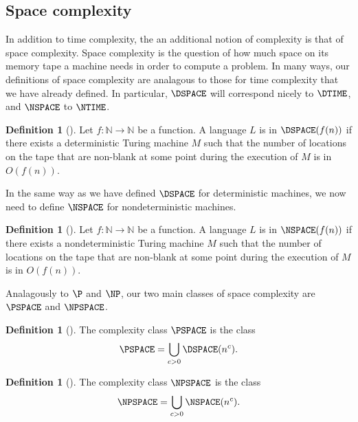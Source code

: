 \documentclass{reedthesis}
\theoremstyle{plain}
\theoremstyle{definition}
\newtheorem{defn}[thm]{Definition}
\theoremstyle{remark}
\numberwithin{equation}{section}
\begin{document}

\subsection{Space complexity}

In addition to time complexity, the an additional notion of complexity is that
of space complexity. Space complexity is the question of how much space on its
memory tape a machine needs in order to compute a problem. In many ways, our
definitions of space complexity are analagous to those for time complexity that
we have already defined. In particular, $\DSPACE$ will correspond nicely to
$\DTIME$, and $\NSPACE$ to $\NTIME$.

\begin{defn}[{\cite[Def.\ 4.1]{AB09}}]\label{def:dspace}
  Let $f: \mathbb{N} \rightarrow \mathbb{N}$ be a function. A language $L$ is in $\DSPACE(f(n))$ if there
  exists a deterministic Turing machine $M$ such that the number of locations on
  the tape that are non-blank at some point during the execution of $M$ is
  in $O(f(n))$.
\end{defn}

In the same way as we have defined $\DSPACE$ for deterministic machines, we now
need to define $\NSPACE$ for nondeterministic machines.

\begin{defn}[{\cite[Def. 4.1]{AB09}}]\label{def:nspace}
  Let $f: \mathbb{N} \rightarrow \mathbb{N}$ be a function. A language $L$ is in $\NSPACE(f(n))$ if there
  exists a nondeterministic Turing machine $M$ such that the number of locations
  on the tape that are non-blank at some point during the execution of $M$ is in
  $O(f(n))$.
\end{defn}

Analagously to $\P$ and $\NP$, our two main classes of space complexity are
$\PSPACE$ and $\NPSPACE$.

\begin{defn}[{\cite[Def.\ 4.5]{AB09}}]\label{def:pspace}
  The complexity class $\PSPACE$ is the class
  \[
    \PSPACE = \bigcup_{c > 0}\DSPACE(n^{c}).
  \]
\end{defn}

\begin{defn}[{\cite[Def.\ 4.5]{AB09}}]\label{def:npspace}
  The complexity class $\NPSPACE$ is the class
  \[
    \NPSPACE = \bigcup_{c > 0}\NSPACE(n^{c}).
  \]
\end{defn}
\end{document}

